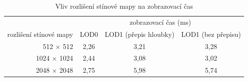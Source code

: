 %
\begin{table}[here]
\centering
\begin{tabular}{|r | c | c | c |} 
\hline 
&\multicolumn{3}{|c|}{zobrazovací čas (ms)}\\
rozlišení stínové mapy			&LOD0		&LOD1 (přepis hloubky)	&LOD1 (bez přepisu)\\
\hline					
512 $\times$ 512	&2,26	&3,21	&3,28 \\
1024 $\times$ 1024	&2,44	&3,08	&3,02\\ 
2048 $\times$ 2048	&2,75	&5,98	&5,74\\
[1ex] 
\hline 
\end{tabular}
\label{table:lod01-shadow}
\caption{Vliv rozlišení stínové mapy na zobrazovací čas}
\end{table}
